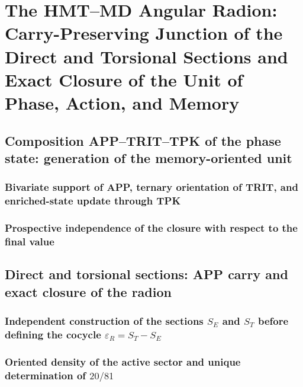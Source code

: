 


\chapter{The HMT--MD Angular Radion: Carry-Preserving Junction of the Direct and Torsional Sections and Exact Closure of the Unit of Phase, Action, and Memory}
\label{chap:sucesor-102-radion}

\section{Composition APP--TRIT--TPK of the phase state: generation of the memory-oriented unit}


\subsection{Bivariate support of APP, ternary orientation of TRIT, and enriched-state update through TPK}


\subsection{Prospective independence of the closure with respect to the final value}


\section{Direct and torsional sections: APP carry and exact closure of the radion}
\subsection{Independent construction of the sections \(S_E\) and \(S_T\) before defining the cocycle \(\varepsilon_R=S_T-S_E\)}

\subsection{Oriented density of the active sector and unique determination of \(20/81\)}

